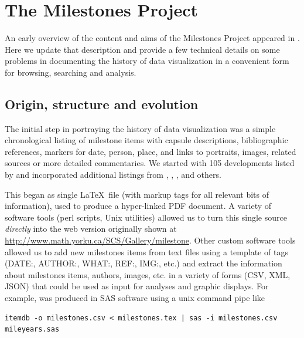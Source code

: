 \section{The Milestones Project}\label{sec:project}
An early overview of the content and aims of the Milestones Project appeared in \cite{Friendly:04:gfkl}.
Here we update that description and provide a few technical details on some problems in
documenting the history of data visualization in a convenient form for browsing, searching and
analysis.

\subsection{Origin, structure and evolution}\label{sec:structure}
The initial step in portraying the history of data visualization was a simple chronological listing of milestone items
with capsule descriptions, bibliographic references, markers for date, person, place, and links to portraits, images,
related sources or more detailed commentaries.
We started with 105
developments listed by \citet{BenigerRobyn:1978}
and incorporated additional listings from
\citet{Hankins:1999},  \citet{Tufte:1983,Tufte:1990,Tufte:1997},  \citet{Heiser:2000}, and others.

This began as single \LaTeX\ file (with markup tags for all relevant bits of information),
used to produce a
hyper-linked PDF document.  A variety of software tools (perl scripts, Unix utilities) allowed us to turn this
single source
\emph{directly} into the web version originally shown at
\url{http://www.math.yorku.ca/SCS/Gallery/milestone}.  Other custom software tools allowed us to
add new milestones items from text files using a template of tags (DATE:, AUTHOR:, WHAT:, REF:, IMG:, etc.)
and extract the
information about milestones items, authors, images, etc. in a variety of forms (CSV, XML, JSON)
that could be used as input for analyses and graphic displays.  For example, 
was produced in SAS software using a unix command pipe like
\begin{verbatim}
itemdb -o milestones.csv < milestones.tex | sas -i milestones.csv mileyears.sas
\end{verbatim}

